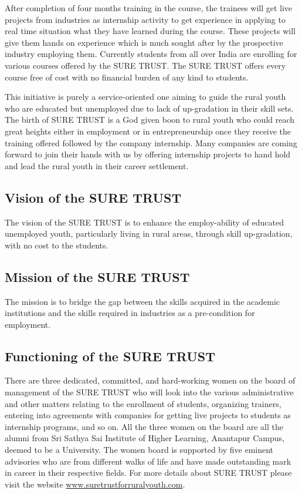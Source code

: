 \documentclass[12pt]{article}
\begin{document}
After completion of four months training in the course, the trainees will get live projects from industries as internship activity to get experience in applying to real time situation what they have learned during the course. These projects will give them hands on experience which is much sought after by the prospective industry employing them. Currently students from all over India are enrolling for various courses offered by the SURE TRUST. The SURE TRUST offers every course free of cost with no financial burden of any kind to students.

 This initiative is purely a service-oriented one aiming to guide the rural youth who are educated but unemployed due to lack of up-gradation in their skill sets. The birth of SURE TRUST is a God given boon to rural youth who could reach great heights either in employment or in entrepreneurship once they receive the training offered followed by the company internship. Many companies are coming forward to join their hands with us by offering internship projects to hand hold and lead the rural youth in their career settlement.
 
 \subsection*{Vision of the SURE TRUST}
 The vision of the SURE TRUST is to enhance the employ-ability of educated unemployed youth,
particularly living in rural areas, through skill up-gradation, with no cost to the students.

 \subsection*{Mission of the SURE TRUST}
The mission is to bridge the gap between the skills acquired in the academic institutions and the
skills required in industries as a pre-condition for employment.

 \subsection*{Functioning of the SURE TRUST}
There are three dedicated, committed, and hard-working women on the board of management
of the SURE TRUST who will look into the various administrative and other matters relating to
the enrollment of students, organizing trainers, entering into agreements with companies for
getting live projects to students as internship programs, and so on. All the three women on the
board are all the alumni from Sri Sathya Sai Institute of Higher Learning, Anantapur Campus,
deemed to be a University. The women board is supported by five eminent advisories who are
from different walks of life and have made outstanding mark in career in their respective fields.
For more details about SURE TRUST please visit the website \href{https://suretrustforruralyouth.com/}{ www.suretrustforruralyouth.com}.
\end{document}
